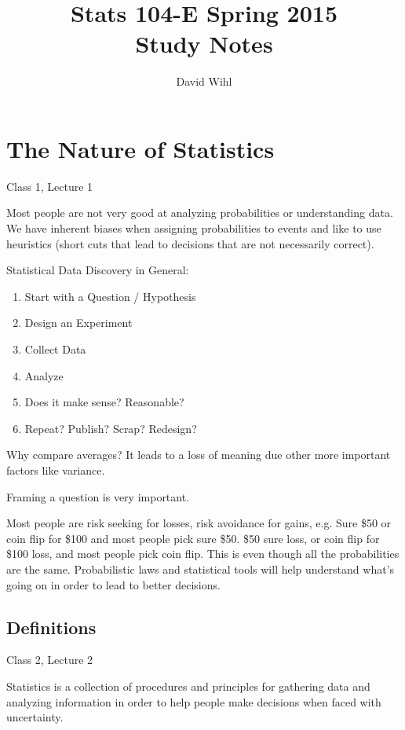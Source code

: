 \documentclass[11pt, oneside]{article}   	%
\title{Stats 104-E Spring 2015 \\ 
{\large Study Notes}
}
\author{
  David Wihl\\
}
\begin{document}
\maketitle

\begingroup
\hypersetup{linkcolor=blue}
\tableofcontents
\endgroup


\section{The Nature of Statistics}
Class 1, Lecture 1

Most people are not very good at analyzing probabilities or understanding data. We have inherent biases when assigning probabilities to events and like to use heuristics (short cuts that lead to decisions that are not necessarily correct).

Statistical Data Discovery in General:
\begin{enumerate}
\item{Start with a Question / Hypothesis}
\item{Design an Experiment}
\item{Collect Data}
\item{Analyze}
\item{Does it make sense? Reasonable?}
\item{Repeat? Publish? Scrap? Redesign?}
\end{enumerate}


Why compare averages? It leads to a loss of meaning due other more important factors like variance. 

Framing a question is very important.

Most people are risk seeking for losses, risk avoidance for gains, e.g. Sure \$50 or coin flip for \$100 and most people pick sure \$50. \$50 sure loss, or coin flip for \$100 loss, and most people pick coin flip. This is even though all the probabilities are the same. Probabilistic laws and statistical tools will help understand what's going on in order to lead to better decisions.

\subsection{Definitions}

Class 2, Lecture 2

Statistics is a collection of procedures and principles for gathering data and analyzing
information in order to help people make decisions when faced with uncertainty. 
\end{document}
